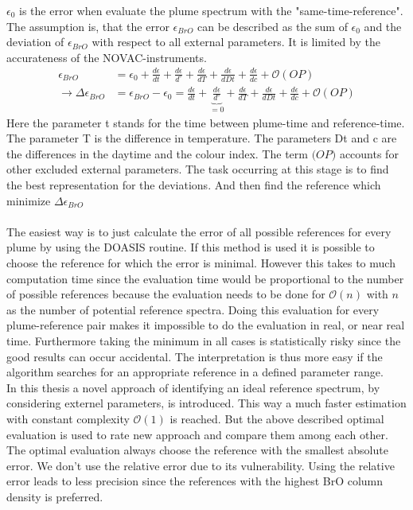 \documentclass  [
  paper    = a4,
  BCOR     = 10mm,
  twoside,
  fontsize = 12pt,
  fleqn,
  toc      = bibnumbered,
  toc      = listofnumbered,
  numbers  = noendperiod,
  headings = normal,
  listof   = leveldown,
  version  = 3.03
]                                       {scrreprt}
\begin{document}
	$\epsilon_{0}$ is the  error when evaluate the plume spectrum with the "same-time-reference".
	The assumption is, that the  error $\epsilon_{BrO}$ can be described as the sum of $\epsilon_{0}$ and the deviation of $\epsilon_{BrO}$ with respect to all external parameters. It is limited by the accurateness of the NOVAC-instruments.
	\begin{align}
		\epsilon_{BrO} &=  \epsilon_{0}+\frac{d\epsilon}{dt}+\frac{d\epsilon}{d ^{\circ}}+\frac{d\epsilon}{dT}+\frac{d\epsilon}{dDt} +\frac{d\epsilon}{dc} + \mathcal{O}\left(OP\right) \\
		\rightarrow \Delta \epsilon_{BrO} &= \epsilon_{BrO} - \epsilon_{0} =\frac{d\epsilon}{dt}+\underbrace{\frac{d\epsilon}{d ^{\circ}}}_{=0}+\frac{d\epsilon}{dT}+\frac{d\epsilon}{dDt} +\frac{d\epsilon}{dc} + \mathcal{O}\left(OP\right) 
		\label{calc:err}
	\end{align}
	Here the parameter t stands for the time between plume-time and reference-time. The parameter T is the difference in temperature. The parameters Dt and c are the differences in the daytime and the colour index. The term $\mathcal(OP)$ accounts for other excluded external parameters.
	The task occurring at this stage is to find the best representation for the deviations. And then find the reference which minimize $\Delta \epsilon_{BrO} $\\
	\\
	The easiest way is to just calculate the  error of all possible references for every plume by using the DOASIS routine. If this method is used it is possible to choose the reference for which the  error is minimal. However this takes to much computation time since the evaluation time would be proportional to the number of possible references because the evaluation needs to be done for $\mathcal{O}(n)$ with $n$ as the number of potential reference spectra. Doing this evaluation for every plume-reference pair makes it impossible to do the evaluation in real, or near real time.
	Furthermore taking the minimum in all cases is statistically risky since the good results can occur accidental. The interpretation is thus more easy if the algorithm searches for an appropriate reference in a defined parameter range.\\
	In this thesis a novel approach of identifying an ideal reference spectrum, by considering externel parameters, is introduced. This way a much faster estimation with constant complexity $\mathcal{O}(1)$ is reached.
	But the above described optimal evaluation is used to rate new approach and compare them among each other. The optimal evaluation always choose the reference with the smallest absolute error. We don't use the relative error due to its vulnerability. Using the relative error leads to less precision since the references with the highest BrO column density is preferred.\\
\end{document}
